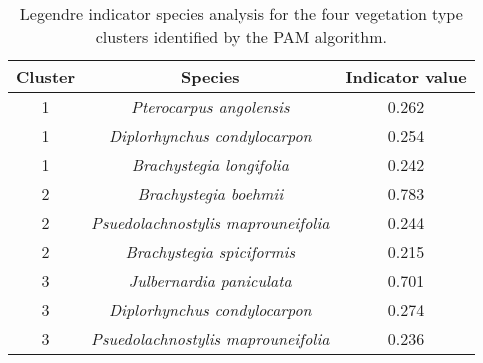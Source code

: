 \begin{table}[h]
\centering
\begin{tabular}{ccc}
  \hline
Cluster & Species & Indicator value \\ 
  \hline
1 & \textit{Pterocarpus angolensis} & 0.262 \\ 
  1 & \textit{Diplorhynchus condylocarpon} & 0.254 \\ 
  1 & \textit{Brachystegia longifolia} & 0.242 \\ 
   \hline
2 & \textit{Brachystegia boehmii} & 0.783 \\ 
  2 & \textit{Psuedolachnostylis maprouneifolia} & 0.244 \\ 
  2 & \textit{Brachystegia spiciformis} & 0.215 \\ 
   \hline
3 & \textit{Julbernardia paniculata} & 0.701 \\ 
  3 & \textit{Diplorhynchus condylocarpon} & 0.274 \\ 
  3 & \textit{Psuedolachnostylis maprouneifolia} & 0.236 \\ 
  \end{tabular}
\caption{Legendre indicator species analysis for the four vegetation type clusters identified by the PAM algorithm.} 
\label{indval}
\end{table}

